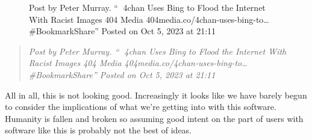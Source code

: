 \begin{figure}
\centering
{}
\caption{Post by Peter Murray. ``🔖 4chan Uses Bing to Flood the
Internet With Racist Images \textbar{} 404 Media
404media.co/4chan-uses-bing-to\ldots{} \#BookmarkShare'' Posted on Oct
5, 2023 at 21:11}
\end{figure}

\begin{quote}
\emph{Post by Peter Murray. ``🔖 4chan Uses Bing to Flood the Internet
With Racist Images \textbar{} 404 Media
404media.co/4chan-uses-bing-to\ldots{} \#BookmarkShare'' Posted on Oct
5, 2023 at 21:11}
\end{quote}

All in all, this is not looking good. Increasingly it looks like we have
barely begun to consider the implications of what we're getting into
with this software. Humanity is fallen and broken so assuming good
intent on the part of users with software like this is probably not the
best of ideas.
